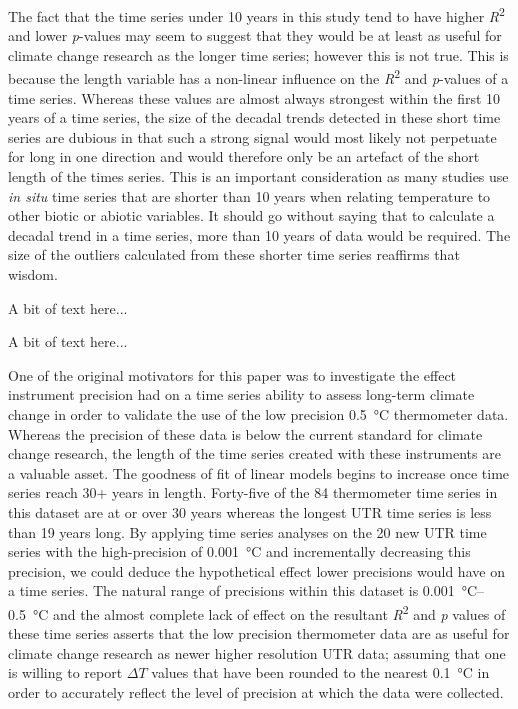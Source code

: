\documentclass{ametsoc}
\begin{document}
The fact that the time series under 10 years in this study tend to have higher \emph{R}\textsuperscript{2} and lower \emph{p}-values may seem to suggest that they would be at least as useful for climate change research as the longer time series; however this is not true. This is because the length variable has a non-linear influence on the \emph{R}\textsuperscript{2} and \emph{p}-values of a time series. Whereas these values are almost always strongest within the first 10 years of a time series, the size of the decadal trends detected in these short time series are dubious in that such a strong signal would most likely not perpetuate for long in one direction and would therefore only be an artefact of the short length of the times series. This is an important consideration as many studies use \emph{in situ} time series that are shorter than 10 years when relating temperature to other biotic or abiotic variables. It should go without saying that to calculate a decadal trend in a time series, more than 10 years of data would be required. The size of the outliers calculated from these shorter time series reaffirms that wisdom.

A bit of text here...

A bit of text here...

One of the original motivators for this paper was to investigate the effect instrument precision had on a time series ability to assess long-term climate change in order to validate the use of the low precision \SI{0.5}{\degreeCelsius} thermometer data. Whereas the precision of these data is below the current standard for climate change research, the length of the time series created with these instruments are a valuable asset. The goodness of fit of linear models begins to increase once time series reach 30+ years in length. Forty-five of the 84 thermometer time series in this dataset are at or over 30 years whereas the longest UTR time series is less than 19 years long. By applying time series analyses on the 20 new UTR time series with the high-precision of \SI{0.001}{\degreeCelsius} and incrementally decreasing this precision, we could deduce the hypothetical effect lower precisions would have on a time series. The natural range of precisions within this dataset is \SIrange{0.001}{0.5}{\degreeCelsius} and the almost complete lack of effect on the resultant \emph{R}\textsuperscript{2} and \emph{p} values of these time series asserts that the low precision thermometer data are as useful for climate change research as newer higher resolution UTR data; assuming that one is willing to report $\Delta T$ values that have been rounded to the nearest \SI{0.1}{\degreeCelsius} in order to accurately reflect the level of precision at which the data were collected.
\end{document}
